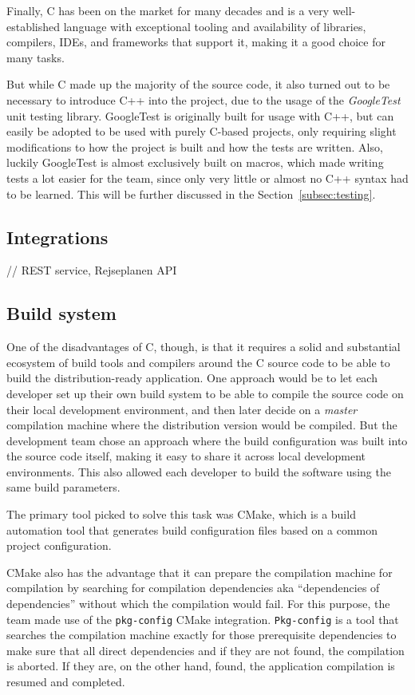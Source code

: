 Finally, C has been on the market for many decades and is a very well-established language with exceptional tooling and
availability of libraries, compilers, IDEs, and frameworks that support it, making it a good choice for many tasks.

But while C made up the majority of the source code, it also turned out to be necessary to introduce C++ into the
project, due to the usage of the \textit{GoogleTest} unit testing library.
GoogleTest is originally built for usage with C++, but can easily be adopted to be used with purely C-based projects,
only requiring slight modifications to how the project is built and how the tests are written.
Also, luckily GoogleTest is almost exclusively built on macros, which made writing tests a lot easier for the team,
since only very little or almost no C++ syntax had to be learned.
This will be further discussed in the Section~\ref{subsec:testing}.

\subsection{Integrations}\label{subsec:integrations}

// REST service, Rejseplanen API

\subsection{Build system}\label{subsec:build-system}

One of the disadvantages of C, though, is that it requires a solid and substantial ecosystem of build tools and
compilers around the C source code to be able to build the distribution-ready application.
One approach would be to let each developer set up their own build system to be able to compile the source code on their
local development environment, and then later decide on a \textit{master} compilation machine where the distribution
version would be compiled.
But the development team chose an approach where the build configuration was built into the source code itself, making
it easy to share it across local development environments.
This also allowed each developer to build the software using the same build parameters.

The primary tool picked to solve this task was CMake, which is a build automation tool that generates build
configuration files based on a common project configuration.

CMake also has the advantage that it can prepare the compilation machine for compilation by searching for compilation
dependencies aka ``dependencies of dependencies'' without which the compilation would fail.
For this purpose, the team made use of the \lstinline{pkg-config} CMake integration. \lstinline{Pkg-config} is a tool
that searches the compilation machine exactly for those prerequisite dependencies to make sure that all direct
dependencies and if they are not found, the compilation is aborted.
If they are, on the other hand, found, the application compilation is resumed and completed.

